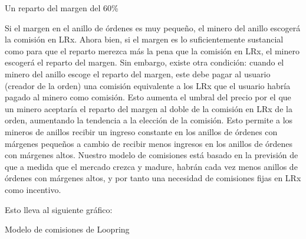 \documentclass[UTF8,nofonts]{article}
\makeatletter
\newenvironment{figurehere}
 {\def\@captype{figure}}
 {}
\makeatother
\begin{document}
\begin{multicols}{2}
\begin{center}
\begin{figurehere}
\begin{tikzpicture}[
scale=1,
font=\bfseries\footnotesize\sffamily,
classical/.style={thick,<->,shorten >=2pt,shorten <=2pt,>=stealth},
oneway/.style={->,dashed,shorten >=2pt,shorten <=2pt,>=stealth}
]
\end{tikzpicture}
\caption{Un reparto del margen del 60\%}
\label{fig:marginsplit}
\end{figurehere}
\end{center}

Si el margen en el anillo de órdenes es muy pequeño, el minero del anillo escogerá la comisión en LRx. Ahora bien, si el margen es lo suficientemente sustancial como para que el reparto merezca más la pena que la comisión en LRx, el minero escogerá el reparto del margen. Sin embargo, existe otra condición: cuando el minero del anillo escoge el reparto del margen, este debe pagar al usuario (creador de la orden) una comisión equivalente a los LRx que el usuario habría pagado al minero como comisión. Esto aumenta el umbral del precio por el que un minero aceptaría el reparto del margen al doble de la comisión en LRx de la orden, aumentando la tendencia a la elección de la comisión. Esto permite a los mineros de anillos recibir un ingreso constante en los anillos de órdenes con márgenes pequeños a cambio de recibir menos ingresos en los anillos de órdenes con márgenes altos. Nuestro modelo de comisiones está basado en la previsión de que a medida que el mercado crezca y madure, habrán cada vez menos anillos de órdenes con márgenes altos, y por tanto una necesidad de comisiones fijas en LRx como incentivo.


Esto lleva al siguiente gráfico:

\begin{center}
\begin{figurehere}
\centering
{}
\caption{Modelo de comisiones de Loopring}
\label{fig:feemodel}
\end{figurehere}
\end{center}



\end{multicols}
\end{document}
